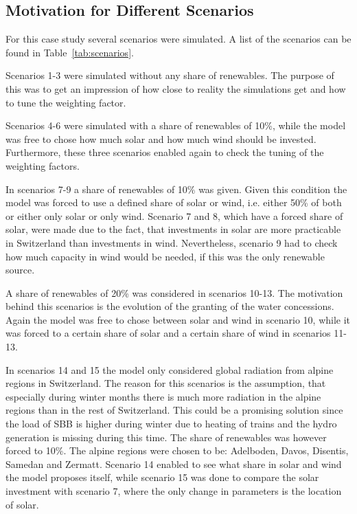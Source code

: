 \subsection{Motivation for Different Scenarios}
For this case study several scenarios were simulated. A list of the scenarios can be found in Table~\ref{tab:scenarios}. 

Scenarios 1-3 were simulated without any share of renewables. The purpose of this was to get an impression of how close to reality the simulations get and how to tune the weighting factor. 

Scenarios 4-6 were simulated with a share of renewables of 10\%, while the model was free to chose how much solar and how much wind should be invested. Furthermore, these three scenarios enabled again to check the tuning of the weighting factors. 

In scenarios 7-9 a share of renewables of 10\% was given. Given this condition the model was forced to use a defined share of solar or wind, i.e. either 50\% of both or either only solar or only wind. Scenario 7 and 8, which have a forced share of solar, were made due to the fact, that investments in solar are more practicable in Switzerland than investments in wind. Nevertheless, scenario 9 had to check how much capacity in wind would be needed, if this was the only renewable source. 

A share of renewables of 20\% was considered in scenarios 10-13. The motivation behind this scenarios is the evolution of the granting of the water concessions. Again the model was free to chose between solar and wind in scenario 10, while it was forced to a certain share of solar and a certain share of wind in scenarios 11-13. 

In scenarios 14 and 15 the model only considered global radiation from alpine regions in Switzerland. The reason for this scenarios is the assumption, that especially during winter months there is much more radiation in the alpine regions than in the rest of Switzerland. This could be a promising solution since the load of SBB is higher during winter due to heating of trains and the hydro generation is missing during this time. The share of renewables was however forced to 10\%. The alpine regions were chosen to be: Adelboden, Davos, Disentis, Samedan and Zermatt. Scenario 14 enabled to see what share in solar and wind the model proposes itself, while scenario 15 was done to compare the solar investment with scenario 7, where the only change in parameters is the location of solar. 

